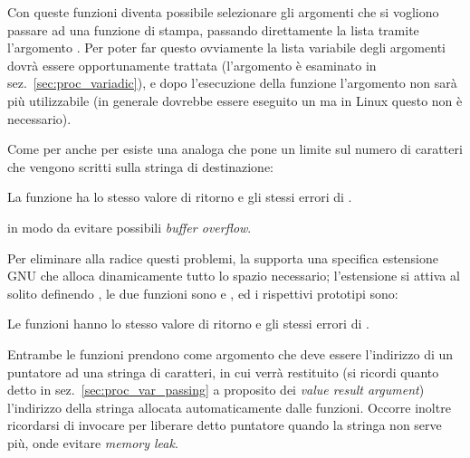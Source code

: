 Con queste funzioni diventa possibile selezionare gli argomenti che si
vogliono passare ad una funzione di stampa, passando direttamente la lista
tramite l'argomento . Per poter far questo ovviamente la lista
variabile degli argomenti dovrà essere opportunamente trattata (l'argomento è
esaminato in sez.~\ref{sec:proc_variadic}), e dopo l'esecuzione della funzione
l'argomento  non sarà più utilizzabile (in generale dovrebbe essere
eseguito un  ma in Linux questo non è necessario).

Come per  anche per  esiste una analoga
 che pone un limite sul numero di caratteri che vengono
scritti sulla stringa di destinazione:

\begin{funcproto}{
}

{La funzione ha lo stesso valore di ritorno e gli stessi errori di
  .}
\end{funcproto}

\noindent in modo da evitare possibili \textit{buffer overflow}.


Per eliminare alla radice questi problemi, la  supporta una
specifica estensione GNU che alloca dinamicamente tutto lo spazio necessario;
l'estensione si attiva al solito definendo , le due
funzioni sono  e , ed i rispettivi prototipi
sono:

\begin{funcproto}{
}

{Le funzioni hanno lo stesso valore di ritorno e gli stessi errori di
  .}
\end{funcproto}


Entrambe le funzioni prendono come argomento  che deve essere
l'indirizzo di un puntatore ad una stringa di caratteri, in cui verrà
restituito (si ricordi quanto detto in sez.~\ref{sec:proc_var_passing} a
proposito dei \textit{value result argument}) l'indirizzo della stringa
allocata automaticamente dalle funzioni. Occorre inoltre ricordarsi di
invocare  per liberare detto puntatore quando la stringa non serve
più, onde evitare \textit{memory leak}.


